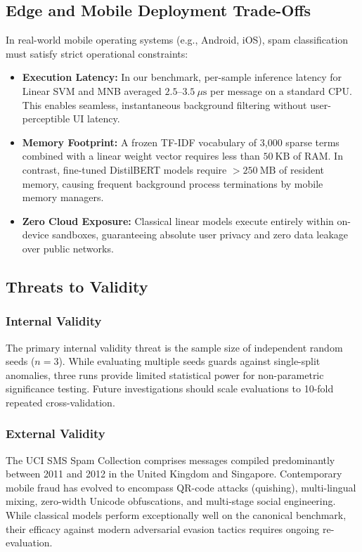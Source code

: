 \documentclass[conference]{IEEEtran}
\begin{document}
\subsection{Edge and Mobile Deployment Trade-Offs}
In real-world mobile operating systems (e.g., Android, iOS), spam classification must satisfy strict operational constraints:
\begin{itemize}
    \item \textbf{Execution Latency:} In our benchmark, per-sample inference latency for Linear SVM and MNB averaged $2.5$--$3.5\ \mu\text{s}$ per message on a standard CPU. This enables seamless, instantaneous background filtering without user-perceptible UI latency.
    \item \textbf{Memory Footprint:} A frozen TF-IDF vocabulary of 3,000 sparse terms combined with a linear weight vector requires less than $50\ \text{KB}$ of RAM. In contrast, fine-tuned DistilBERT models require $>250\ \text{MB}$ of resident memory, causing frequent background process terminations by mobile memory managers.
    \item \textbf{Zero Cloud Exposure:} Classical linear models execute entirely within on-device sandboxes, guaranteeing absolute user privacy and zero data leakage over public networks.
\end{itemize}

\subsection{Threats to Validity}
\subsubsection{Internal Validity}
The primary internal validity threat is the sample size of independent random seeds ($n = 3$). While evaluating multiple seeds guards against single-split anomalies, three runs provide limited statistical power for non-parametric significance testing. Future investigations should scale evaluations to 10-fold repeated cross-validation.

\subsubsection{External Validity}
The UCI SMS Spam Collection comprises messages compiled predominantly between 2011 and 2012 in the United Kingdom and Singapore. Contemporary mobile fraud has evolved to encompass QR-code attacks (quishing), multi-lingual mixing, zero-width Unicode obfuscations, and multi-stage social engineering. While classical models perform exceptionally well on the canonical benchmark, their efficacy against modern adversarial evasion tactics requires ongoing re-evaluation.
\end{document}
